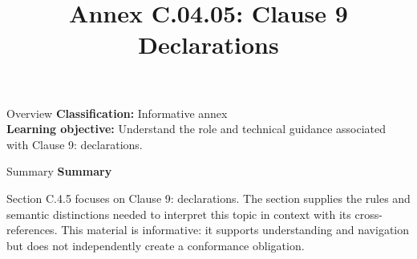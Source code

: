 \documentclass[10pt,letterpaper]{article}
\title{Annex C.04.05: Clause 9 Declarations}
\author{}
\date{}
\begin{document}
\maketitle
\begin{CornellOverviewBox}{Overview}
\textbf{Classification:} Informative annex\\[2pt]
\textbf{Learning objective:} Understand the role and technical guidance associated with Clause 9: declarations.
\end{CornellOverviewBox}\begin{CornellSummaryBox}{Summary}
{\sffamily\bfseries\color{Accent} Summary}\par\vspace{3pt}Section C.4.5 focuses on Clause 9: declarations. The section supplies the rules and semantic distinctions needed to interpret this topic in context with its cross-references. This material is informative: it supports understanding and navigation but does not independently create a conformance obligation.
\end{CornellSummaryBox}
\end{document}
